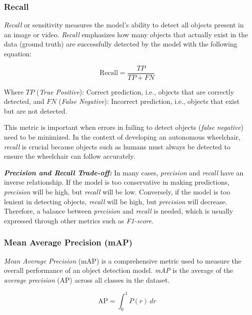 \vspace{5pt}
\subsubsection{Recall}
\label{subsubsec:recall}

\emph{Recall} or sensitivity measures the model's ability to detect all objects present in an image or video. \emph{Recall} emphasizes how many objects that actually exist in the data (ground truth) are successfully detected by the model with the following equation:

\begin{equation}
  \mathrm{Recall} = \frac{TP}{TP + FN}
\end{equation}

Where \(TP\) (\emph{True Positive}): Correct prediction, i.e., objects that are correctly detected, and \(FN\) (\emph{False Negative}): Incorrect prediction, i.e., objects that exist but are not detected.

This metric is important when errors in failing to detect objects (\emph{false negative}) need to be minimized. In the context of developing an autonomous wheelchair, \emph{recall} is crucial because objects such as humans must always be detected to ensure the wheelchair can follow accurately.

\textbf{\emph{Precision and Recall Trade-off:}} In many cases, \emph{precision} and \emph{recall} have an inverse relationship. If the model is too conservative in making predictions, \emph{precision} will be high, but \emph{recall} will be low. Conversely, if the model is too lenient in detecting objects, \emph{recall} will be high, but \emph{precision} will decrease. Therefore, a balance between \emph{precision} and \emph{recall} is needed, which is usually expressed through other metrics such as \emph{F1-score}.

\vspace{5pt}
\subsubsection{Mean Average Precision (mAP)}
\label{subsubsec:mAP}

\emph{Mean Average Precision} (mAP) is a comprehensive metric used to measure the overall performance of an object detection model. \emph{mAP} is the average of the \emph{average precision} (AP) across all classes in the dataset.

\begin{equation}
  \mathrm{AP} = \int_0^1 P(r) \, dr
\end{equation}

